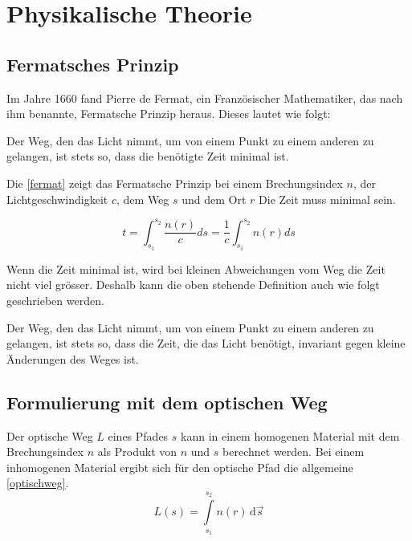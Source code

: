 \section{Physikalische Theorie}

\subsection{Fermatsches Prinzip}
Im Jahre 1660 fand Pierre de Fermat, 
ein Französischer Mathematiker, das 
nach ihm benannte, Fermatsche Prinzip heraus. 
Dieses lautet wie folgt:

\begin{definition}
	Der Weg, den das Licht nimmt, 
	um von einem Punkt zu einem anderen zu gelangen, 
	ist stets so, dass die benötigte Zeit minimal ist.
\end{definition}

Die \eqref{fermat} zeigt das Fermatsche Prinzip bei einem Brechungsindex $n$, 
der Lichtgeschwindigkeit $c$, dem Weg $s$ und dem Ort $r$ Die Zeit muss minimal sein.

\begin{equation}
	t= \int_{s_1}^{s_2} \frac{n(r)}{c} ds = \frac{1}{c} \int_{s_1}^{s_2} n(r) ds
	\label{fermat}
\end{equation}


Wenn die Zeit minimal ist, wird bei kleinen Abweichungen vom Weg die Zeit nicht viel grösser. 
Deshalb kann die oben stehende Definition auch wie folgt geschrieben werden.

\begin{definition}
	Der Weg, den das Licht nimmt, 
	um von einem Punkt zu einem anderen zu gelangen, 
	ist stets so, dass die Zeit, die das Licht benötigt, 
	invariant gegen kleine Änderungen des Weges ist.
\end{definition}

\subsection{Formulierung mit dem optischen Weg}
Der optische Weg $L$  eines Pfades $s$ kann in einem homogenen Material 
mit dem Brechungsindex $n$ als Produkt von $n$ und $s$ berechnet werden.
Bei einem inhomogenen Material ergibt sich für den optische Pfad die allgemeine \eqref{optischweg}.
\begin{equation}
	L(s) = \int\limits_{s_1}^{s_2} n(r) \,\mathrm d\vec s 
	\label{optischweg}
\end{equation}

